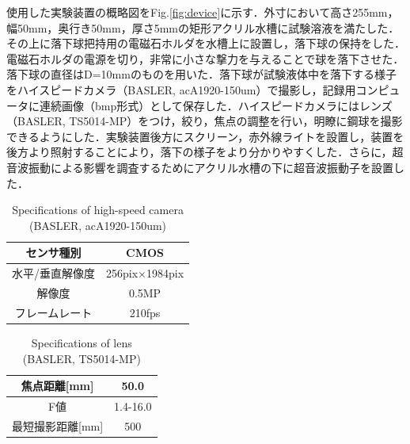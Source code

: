 使用した実験装置の概略図をFig.\ref{fig:device}に示す．外寸において高さ255mm，幅50mm，奥行き50mm，厚さ5mmの矩形アクリル水槽に試験溶液を満たした．その上に落下球把持用の電磁石ホルダを水槽上に設置し，落下球の保持をした．電磁石ホルダの電源を切り，非常に小さな撃力を与えることで球を落下させた．落下球の直径はD=10mmのものを用いた．落下球が試験液体中を落下する様子をハイスピードカメラ（BASLER, acA1920-150um）で撮影し，記録用コンピュータに連続画像（bmp形式）として保存した．ハイスピードカメラにはレンズ（BASLER, TS5014-MP）をつけ，絞り，焦点の調整を行い，明瞭に鋼球を撮影できるようにした．実験装置後方にスクリーン，赤外線ライトを設置し，装置を後方より照射することにより，落下の様子をより分かりやすくした．さらに，超音波振動による影響を調査するためにアクリル水槽の下に超音波振動子を設置した．

\begin{table}[ht]
    \centering
    \caption{Specifications of high-speed camera (BASLER, acA1920-150um)}
    \label{table:camera}
    \begin{tabular}{c|c}\hline
        センサ種別      & CMOS                  \\ \hline
        水平/垂直解像度 & 256pix$\times$1984pix \\ \hline
        解像度          & 0.5MP                 \\ \hline
        フレームレート  & 210fps                \\ \hline
    \end{tabular}
\end{table}

\begin{table}[ht]
    \centering
    \caption{Specifications of lens (BASLER, TS5014-MP)}
    \label{table:lens}
    \begin{tabular}{c|c}\hline
        焦点距離[mm]     & 50.0     \\ \hline
        F値              & 1.4-16.0 \\ \hline
        最短撮影距離[mm] & 500      \\ \hline
    \end{tabular}
\end{table}

